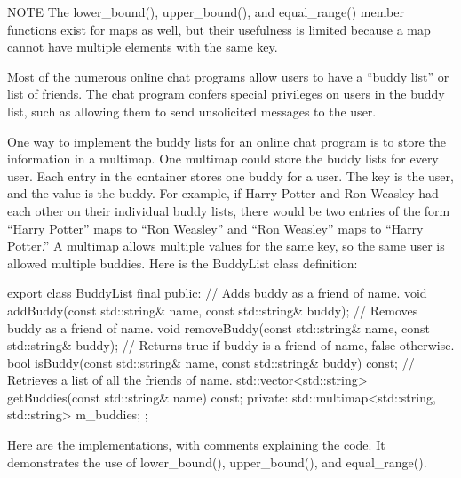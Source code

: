 \begin{myNotic}{NOTE}
The lower\_bound(), upper\_bound(), and equal\_range() member functions exist for maps as well, but their usefulness is limited because a map cannot have multiple elements with the same key.
\end{myNotic}


Most of the numerous online chat programs allow users to have a “buddy list” or list of friends. The chat program confers special privileges on users in the buddy list, such as allowing them to send unsolicited messages to the user.

One way to implement the buddy lists for an online chat program is to store the information in a multimap. One multimap could store the buddy lists for every user. Each entry in the container stores one buddy for a user. The key is the user, and the value is the buddy. For example, if Harry Potter and Ron Weasley had each other on their individual buddy lists, there would be two entries of the form “Harry Potter” maps to “Ron Weasley” and “Ron Weasley” maps to “Harry Potter.” A multimap allows multiple values for the same key, so the same user is allowed multiple buddies. Here is the BuddyList class definition:

\begin{cpp}
export class BuddyList final
{
    public:
        // Adds buddy as a friend of name.
        void addBuddy(const std::string& name, const std::string& buddy);
        // Removes buddy as a friend of name.
        void removeBuddy(const std::string& name, const std::string& buddy);
        // Returns true if buddy is a friend of name, false otherwise.
        bool isBuddy(const std::string& name, const std::string& buddy) const;
        // Retrieves a list of all the friends of name.
        std::vector<std::string> getBuddies(const std::string& name) const;
    private:
        std::multimap<std::string, std::string> m_buddies;
};
\end{cpp}

Here are the implementations, with comments explaining the code. It demonstrates the use of lower\_bound(), upper\_bound(), and equal\_range().

